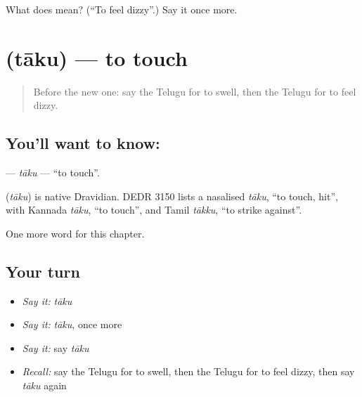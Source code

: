 \begin{tcolorbox}[breakable,colback=teal!4,colframe=teal!35!black,title={Before you move on}]
What does   mean? (\textquotedblleft{}To feel dizzy\textquotedblright{}.) Say it once more.
\end{tcolorbox}
\section[\texorpdfstring{\te{తాకు} (tāku)}{తాకు (tāku)}]{ (tāku) — to touch}

\label{lesson:TE-C279-taku}



\begin{quote}
Before the new one: say the Telugu for to swell, then the Telugu for to feel dizzy.
\end{quote}

\subsection*{You'll want to know: }
\textbf{} — \emph{tāku} — \textquotedblleft{}to touch\textquotedblright{}.

\begin{cousinweb}
\textbf{} (\emph{tāku}) is native Dravidian. DEDR 3150 lists a nasalised \emph{tāku}, \textquotedblleft{}to touch, hit\textquotedblright{}, with Kannada \emph{tāku}, \textquotedblleft{}to touch\textquotedblright{}, and Tamil \emph{tākku}, \textquotedblleft{}to strike against\textquotedblright{}.
\end{cousinweb}

\begin{grammarlens}[title={What you've built}]
One more word for this chapter.
\end{grammarlens}

\subsection*{Your turn}
\begin{itemize}
\raggedright
  \item \emph{Say it:} \emph{tāku}
  \item \emph{Say it:} \emph{tāku}, once more
  \item \emph{Say it:} say \emph{tāku}
  \item \emph{Recall:} say the Telugu for to swell, then the Telugu for to feel dizzy, then say \emph{tāku} again
\end{itemize}

